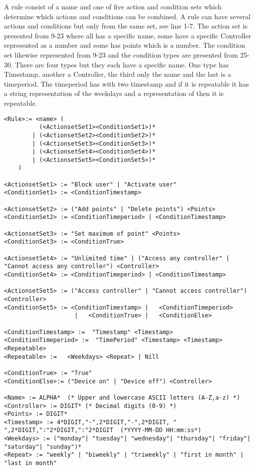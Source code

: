A rule consist of a name and one of five action and condition sets which determine which actions and conditions can be combined. A rule can have several actions and conditions but only from the same set, see line 1-7. The action set is presented from 9-23 where all has a specific name, some have a specific Controller represented as a number and some has points which is a number. The condition set likewise represented from 9-23 and the condition types are presented from 25-30. There are four types but they each have a specific name. One type has Timestamp, another a Controller, the third only the name and the last is a timeperiod. The timeperiod has with two timestamp and if it is repeatable it has a string representation of the weekdays and a representation of then it is repeatable. 
\begin{lstlisting}[label=grammar, caption=Grammar of a rule in EBNF]
<Rule>:= <name> (
	 	  (<ActionsetSet1><ConditionSet1>)*
		| (<ActionsetSet2><ConditionSet2>)*
		| (<ActionsetSet3><ConditionSet3>)*
		| (<ActionsetSet4><ConditionSet4>)*
		| (<ActionsetSet5><ConditionSet5>)*
	)

<ActionsetSet1> := "Block user" | "Activate user" 
<ConditionSet1> := <ConditionTimestamp>

<ActionsetSet2> := ("Add points" | "Delete points") <Points>
<ConditionSet2> := <ConditionTimeperiod> | <ConditionTimestamp>

<ActionsetSet3> := "Set maximum of point" <Points>
<ConditionSet3> := <ConditionTrue>

<ActionsetSet4> := "Unlimited time" | ("Access any controller" | "Cannot access any controller") <Controller>
<ConditionSet4> := <ConditionTimeperiod> | <ConditionTimestamp> 

<ActionsetSet5> := ("Access controller" | "Cannot access controller")<Controller>
<ConditionSet5> := <ConditionTimestamp> |	<ConditionTimeperiod> 
					| 	<ConditionTrue>	|	<ConditionElse>	
				
<ConditionTimestamp> :=  "Timestamp" <Timestamp>
<ConditionTimeperiod> :=  "TimePeriod" <Timestamp> <Timestamp> <Repeatable>					
<Repeatable> :=   <Weekdays> <Repeat> | Nill

<ConditionTrue> := "True" 
<ConditionElse>:= ("Device on" | "Device off") <Controller>
				
<Name> := ALPHA*  (* Upper and lowercase ASCII letters (A-Z,a-z) *)
<Controller> := DIGIT* (* Decimal digits (0-9) *)
<Points> := DIGIT*
<Timestamp> := 4*DIGIT,"-",2*DIGIT,"-",2*DIGIT, " ",2*DIGIT,":"2*DIGIT,":"2*DIGIT  (*YYYY-MM-DD HH:mm:ss*)
<Weekdays> := ("monday"| "tuesday"| "wednesday"| "thursday"| "friday"| "saturday"| "sunday")*
<Repeat> := "weekly" | "biweekly" | "triweekly" | "first in month" | "last in month"
\end{lstlisting}
